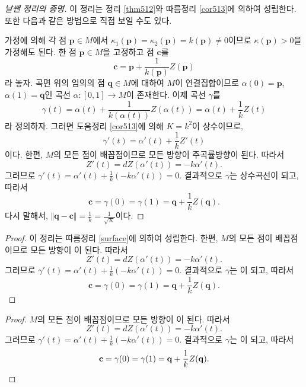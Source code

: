 \begin{proof}[날쌘 정리의 증명]
이 정리는 정리 \ref{thm512}와 따름정리 \ref{cor513}에 의하여 성립한다.
또한 다음과 같은 방법으로 직접 보일 수도  있다.

가정에 의해 각 점 $\mathbf{p}\in M$에서
$\kappa_1(\mathbf{p}) = \kappa_2( \mathbf{p}) = k(\mathbf{p}) \ne 0$이므로
$\kappa(\mathbf{p}) > 0$을 가정해도 된다.
한 점 $\mathbf{p} \in M$을 고정하고 점 $\mathbf{c}$를
\[
\mathbf{c} = \mathbf{p} + \frac{1}{k(\mathbf{p})}
Z(\mathbf{p})
\]
라 놓자. 곡면 위의 임의의 점 $\mathbf{q}\in M$에 대하여 $M$이
연결집합이므로
$\alpha(0) = \mathbf{p}$, $\alpha(1) = \mathbf{q}$인 곡선
$\alpha : [0, 1] \to M$이 존재한다. 이제 곡선 $\gamma$를
\[
\gamma(t) = \alpha(t) + \frac{1}{k(\alpha(t))} Z(\alpha(t)) =
\alpha(t) + \frac 1k Z(t)
\]
라 정의하자. 그러면 도움정리 \ref{cor513}에 의해 $K = k^2$이
상수이므로,
\[
\gamma'(t) = \alpha'(t) + \frac 1k Z'(t)
\]
이다. 한편, $M$의 모든 점이 배꼽점이므로 모든 방향이
주곡률방향이 된다. 따라서
\[
Z'(t) = dZ(\alpha'(t)) = -k \alpha'(t).
\]
그러므로 $\displaystyle \gamma'(t) = \alpha'(t) +
\frac 1k (-k \alpha'(t)) = 0.$
결과적으로
$\gamma$는 상수곡선이 되고, 따라서
\[
\mathbf{c} = \gamma(0) = \gamma(1) = \mathbf{q} +
\frac 1k Z(\mathbf{q}).
\]
다시 말해서, $\displaystyle \Vert \mathbf{q} - \mathbf{c}\Vert = \frac 1k =
\frac{1}{\sqrt K}$이다.
\end{proof}

\begin{proof}
이 정리는 따름정리 \ref{surface}에 의하여 성립한다. 한편, $M$의 모든 점이 배꼽점이므로 모든 방향이
이 된다. 따라서
\[
Z'(t) = dZ(\alpha'(t)) = -k \alpha'(t).
\]
그러므로 $\displaystyle \gamma'(t) = \alpha'(t) +
\frac 1k (-k \alpha'(t)) = 0.$
결과적으로
$\gamma$는 이 되고, 따라서
\[
\mathbf{c} = \gamma(0) = \gamma(1) = \mathbf{q} +
\frac 1k Z(\mathbf{q}).
\]
\end{proof}

\begin{proof}
$M$의 모든 점이 배꼽점이므로 모든 방향이
이 된다. 따라서
\[
Z'(t) = dZ(\alpha'(t)) = -k \alpha'(t).
\]
그러므로 $\displaystyle \gamma'(t) = \alpha'(t) +
\frac 1k (-k \alpha'(t)) = 0.$
결과적으로
$\gamma$는 이 되고, 따라서
\[
\mathbf{c} = \gamma(0) = \gamma(1) = \mathbf{q} +
\frac 1k Z(\mathbf{q}).\qedhere
\]
\end{proof}
